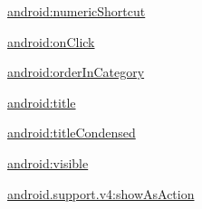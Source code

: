 {\ttfamily \hyperlink{classandroid_1_1support_1_1v4_1_1R_1_1styleable_a1f4749c61207ae550ca1399836eee0d3}{android\+:numeric\+Shortcut}}

{\ttfamily \hyperlink{classandroid_1_1support_1_1v4_1_1R_1_1styleable_acb8f5023cfce902cf351f49364d68143}{android\+:on\+Click}}

{\ttfamily \hyperlink{classandroid_1_1support_1_1v4_1_1R_1_1styleable_ab9d9472a2e90c5fdcf27802d8eb81618}{android\+:order\+In\+Category}}

{\ttfamily \hyperlink{classandroid_1_1support_1_1v4_1_1R_1_1styleable_a42591e9c083d69eb5cea71e1accd2d2b}{android\+:title}}

{\ttfamily \hyperlink{classandroid_1_1support_1_1v4_1_1R_1_1styleable_a45ff077834fcd2795e645a9cb5facc6c}{android\+:title\+Condensed}}

{\ttfamily \hyperlink{classandroid_1_1support_1_1v4_1_1R_1_1styleable_a7ecbdc18eb559caa4b13337a04e90d37}{android\+:visible}}

{\ttfamily \hyperlink{classandroid_1_1support_1_1v4_1_1R_1_1styleable_af0324d2b0e053a7dd60cd8d48f7915dc}{android.\+support.\+v4\+:show\+As\+Action}}

